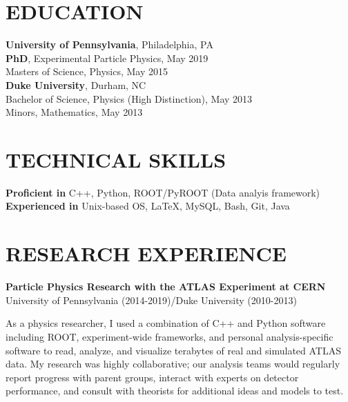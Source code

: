 \documentclass[10pt]{res}
\begin{document}
\begin{resume}

 
\section{EDUCATION}          
    {\bf University of Pennsylvania}, Philadelphia, PA \\
    {\bf PhD}, Experimental Particle Physics, May 2019 \\
    Masters of Science, Physics, May 2015 \\
    \newline
    {\bf Duke University}, Durham, NC \\        
    Bachelor of Science, Physics (High Distinction), May 2013   \\       
    Minors, Mathematics, May 2013 
 
\section{TECHNICAL SKILLS}
    {\bf Proficient in} C++, Python, ROOT/PyROOT (Data analyis framework)\\
    {\bf Experienced in} Unix-based OS, \LaTeX, MySQL, Bash, Git, Java %

\section{RESEARCH EXPERIENCE}%
    {\bf Particle Physics Research with the ATLAS Experiment at CERN}\\
    University of Pennsylvania (2014-2019)/Duke University (2010-2013)

    As a physics researcher, I used a combination of C++ and Python software including ROOT, experiment-wide frameworks, and personal analysis-specific software to read, analyze, and visualize terabytes of real and simulated ATLAS data.
    My research was highly collaborative; our analysis teams would regularly report progress with parent groups, interact with experts on detector performance, and consult with theorists for additional ideas and models to test.
    

\end{resume}
\end{document}
